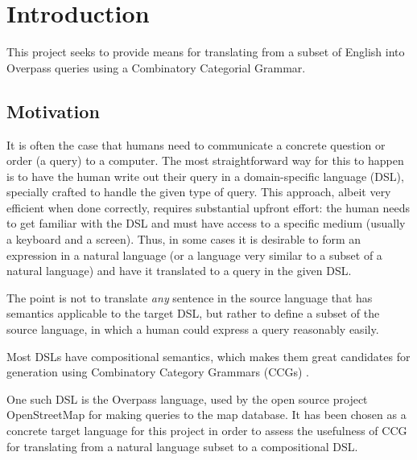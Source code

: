 \documentclass[main.tex]{subfiles}
\begin{document}
\section{Introduction}
This project seeks to provide means for translating from a subset of English
into Overpass queries using a Combinatory Categorial Grammar.

\subsection{Motivation}
It is often the case that humans need to communicate a concrete question
or order (a query) to a computer. The most straightforward way for this to happen is
to have the human write out their query in a domain-specific language (DSL),
specially crafted to handle the given type of query. This approach, albeit
very efficient when done correctly, requires substantial upfront effort:
the human needs to get familiar with the DSL and must have access to a specific
medium
(usually a keyboard and a screen). Thus, in some cases it is desirable
to form an expression in a natural language (or a language very similar to a
subset of a natural language) and have it translated to a query in the given
DSL.

The point is not to translate \emph{any} sentence in the source language
that has semantics applicable to the target DSL, but rather to define a
subset of the source language, in which a human could express a query
reasonably easily.

Most DSLs have compositional semantics, which makes them great candidates
for generation using Combinatory Category Grammars (CCGs) \cite[p.~181]{nts}.

One such DSL is the Overpass language, used by the open source project
OpenStreetMap for making queries to the map database. It has been chosen as
a concrete target language for this project in order to assess the usefulness
of CCG for translating from a natural language subset to a compositional
DSL.
\end{document}

